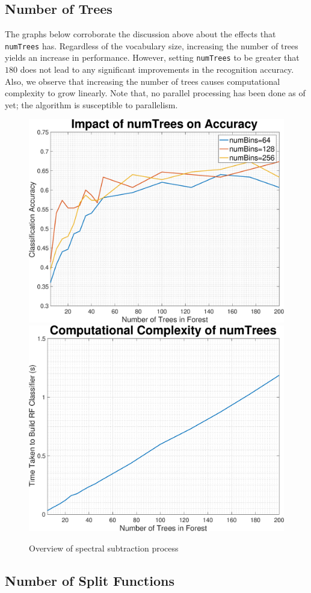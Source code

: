 \documentclass[a4paper,pra,twocolumn,10pt,aps,longbibliography,nobalancelastpage]{revtex4-1}
\begin{document}
\subsection*{Number of Trees}

The graphs below corroborate the discussion above about the effects that \texttt{numTrees} has. Regardless of the vocabulary size, increasing the number of trees yields an increase in performance. However, setting  \texttt{numTrees} to be greater that $180$ does not lead to any significant improvements in the recognition accuracy. Also, we observe that increasing the number of trees causes computational complexity to grow linearly. Note that, no parallel processing has been done as of yet; the algorithm is susceptible to parallelism. 

\begin{figure}[H]
	\centering
    \includegraphics[width=0.49\columnwidth]{numTrees_acc}
	\includegraphics[width=0.49\columnwidth]{numTrees_complexity}
    \caption{Overview of spectral subtraction process}
    \label{fig:numtrees_caltech}
\end{figure}

\subsection*{Number of Split Functions}
\end{document}
